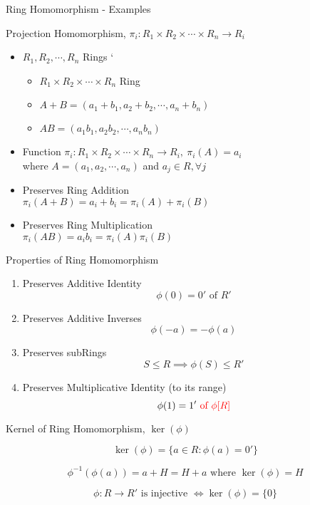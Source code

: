 \documentclass{beamer}
\newcommand{\subring}{\le}
\begin{document}
\begin{frame}{Ring Homomorphism - Examples}
\begin{exampleblock}{Projection Homomorphism, $\pi_i : R_1 \times R_2 \times \cdots \times R_n \to R_i$}
\begin{itemize}
	\item $R_1,R_2,\cdots,R_n$ Rings
`	\begin{itemize}
		\item $R_1 \times R_2 \times \cdots \times R_n$ Ring
		\item $A+B = (a_1+b_1, a_2+b_2, \cdots, a_n+b_n)$
		\item $AB = (a_1b_1, a_2b_2, \cdots, a_nb_n)$
	\end{itemize}
	\item Function $\pi_i : R_1 \times R_2 \times \cdots \times R_n \to R_i,\ \pi_i(A) =  a_i$\\
		where $A=(a_1,a_2,\cdots,a_n)$ and $a_j \in R,\forall j$
	\item Preserves Ring Addition \\
		$\pi_i(A+B) = a_i + b_i = \pi_i(A)+\pi_i(B)$ 
	\item Preserves Ring Multiplication\\
		$\pi_i(AB)  = a_ib_i = \pi_i(A)\pi_i(B)$
\end{itemize}
\end{exampleblock}
\end{frame}

\begin{frame}{Properties of Ring Homomorphism}
\begin{enumerate}
	\item Preserves Additive Identity
		$$\phi(0) = 0' \text{ of } R'$$
	\item Preserves Additive Inverses
		$$\phi(-a) = -\phi(a)$$
	\item Preserves subRings
		$$S \subring R \implies \phi(S) \subring R'$$
	\item Preserves Multiplicative Identity (to its range)
		$$\phi(1) = 1' {\color{red}\text{ of } \phi[R]}$$
\end{enumerate}
\end{frame}

\begin{frame}{Kernel of Ring Homomorphism, $\ker(\phi)$}
\begin{definition}
	$$\ker(\phi) = \{ a \in R : \phi(a) = 0' \}$$
\end{definition}

\begin{theorem}
	$$\phi^{-1}(\phi(a)) = a+H = H+a \text{ where }\ker(\phi) = H $$
\end{theorem}

\begin{theorem}
	$$\phi : R \to R' \text{ is injective } \iff \ker(\phi) = \{0\}$$
\end{theorem}
\end{frame}
\end{document}

